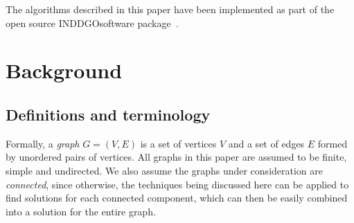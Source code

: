 \documentclass[conference]{IEEEtran}
\begin{document}

The algorithms described in this paper have been implemented as part of the
open source INDDGO\footnotemark software package~\cite{inddgo}.



\section{Background}

\subsection{Definitions and terminology}
Formally, a {\em graph} $G=(V,E)$ is a set of vertices $V$ and a set of edges $E$ formed by unordered pairs of vertices. All graphs in this paper are assumed to be finite, simple and undirected. We also assume the graphs under consideration are {\em connected}, since otherwise, the techniques being discussed here can be applied to find solutions for each connected component, which can then be easily combined into a solution for the entire graph.
\end{document}
